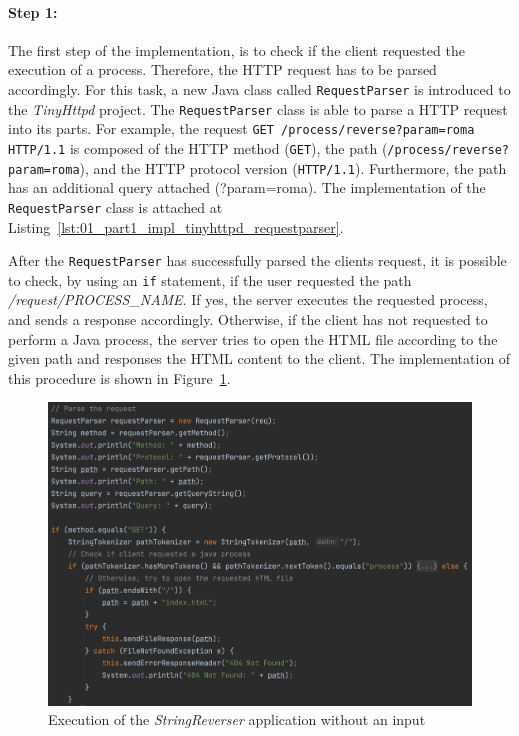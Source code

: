 \documentclass{article}
\def\Fig#1{Figure~\ref{#1}}
\def\Lst#1{Listing~\ref{#1}}
\begin{document}
\paragraph{Step 1:}
The first step of the implementation, is to check if the client requested the execution of a process. Therefore, the HTTP request has to be parsed accordingly. For this task, a new Java class called \texttt{RequestParser} is introduced to the \textit{TinyHttpd} project. The \texttt{RequestParser} class is able to parse a HTTP request into its parts. For example, the request \texttt{GET /process/reverse?param=roma HTTP/1.1} is composed of the HTTP method (\texttt{GET}), the path (\texttt{/process/reverse?param=roma}), and the HTTP protocol version (\texttt{HTTP/1.1}). Furthermore, the path has an additional query attached (?param=roma). The implementation of the \texttt{RequestParser} class is attached at \Lst{lst:01_part1_impl_tinyhttpd_requestparser}.


After the \texttt{RequestParser} has successfully parsed the clients request, it is possible to check, by using an \texttt{if} statement, if the user requested the path \textit{/request/PROCESS\_NAME}. If yes, the server executes the requested process, and sends a response accordingly. Otherwise, if the client has not requested to perform a Java process, the server tries to open the HTML file according to the given path and responses the HTML content to the client. The implementation of this procedure is shown in \Fig{fig:01_part1_impl_tinyhttpd_parsing}.
\begin{figure}[h]
\centering
\includegraphics[scale=0.4]{images/TinyHttpdParsing}
\caption{Execution of the \textit{StringReverser} application without an input}
\label{fig:01_part1_impl_tinyhttpd_parsing}
\end{figure}
\end{document}
